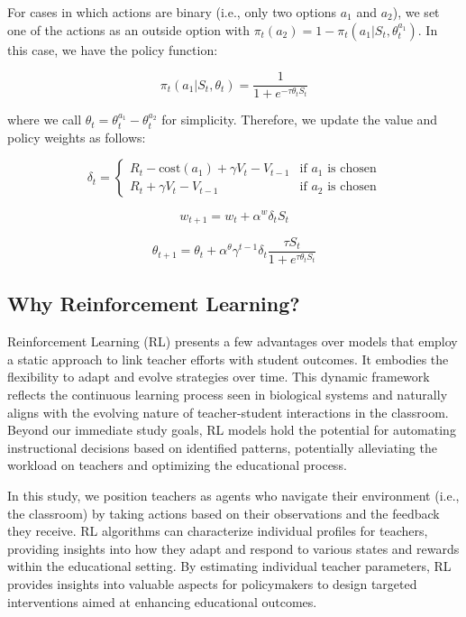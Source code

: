 \documentclass[
  number,
  preprint,
  3p,
  onecolumn]{elsarticle}
\begin{document}
For cases in which actions are binary (i.e., only two options \(a_1\)
and \(a_2\)), we set one of the actions as an outside option with
\(\pi_t(a_2) = 1 - \pi_t(a_1|S_t,\theta^{a_1}_t)\). In this case, we
have the policy function:

\[
\pi_t(a_1|S_t,\theta_t) = \frac{1}{1 + e^{-\tau \theta_t S_t}}
\]

where we call \(\theta_t = \theta^{a_1}_t - \theta^{a_2}_t\) for
simplicity. Therefore, we update the value and policy weights as
follows:

\[
\delta_t =
\begin{cases}
R_{t} - \text{cost}(a_1) + \gamma V_t - V_{t-1} & \text{if } a_1 \text{ is chosen} \\
R_{t} + \gamma V_t - V_{t-1} & \text{if } a_2 \text{ is chosen}
\end{cases}
\]

\[
w_{t+1} = w_{t} + \alpha^w \delta_t S_t
\]

\[
\theta_{t+1} = \theta_{t} + \alpha^{\theta} \gamma^{t-1} \delta_t \frac{\tau S_t}{1 + e^{\tau \theta_t S_t}}
\]

\subsection{Why Reinforcement
Learning?}\label{why-reinforcement-learning}

Reinforcement Learning (RL) presents a few advantages over models that
employ a static approach to link teacher efforts with student outcomes.
It embodies the flexibility to adapt and evolve strategies over time.
This dynamic framework reflects the continuous learning process seen in
biological systems and naturally aligns with the evolving nature of
teacher-student interactions in the classroom. Beyond our immediate
study goals, RL models hold the potential for automating instructional
decisions based on identified patterns, potentially alleviating the
workload on teachers and optimizing the educational process.

In this study, we position teachers as agents who navigate their
environment (i.e., the classroom) by taking actions based on their
observations and the feedback they receive. RL algorithms can
characterize individual profiles for teachers, providing insights into
how they adapt and respond to various states and rewards within the
educational setting. By estimating individual teacher parameters, RL
provides insights into valuable aspects for policymakers to design
targeted interventions aimed at enhancing educational outcomes.
\end{document}
